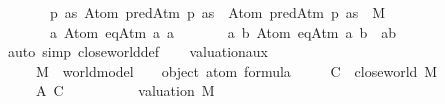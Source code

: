 \begin{isabellebody}
\ \ \ \ \ \ {\isasymor}\ {\isacharparenleft}{\kern0pt}{\isasymexists}p\ as{\isachardot}{\kern0pt}\ {\isasymphi}{\isacharequal}{\kern0pt}\isactrlbold {\isasymnot}{\isacharparenleft}{\kern0pt}Atom\ {\isacharparenleft}{\kern0pt}predAtm\ p\ as{\isacharparenright}{\kern0pt}{\isacharparenright}{\kern0pt}\ {\isasymand}\ Atom\ {\isacharparenleft}{\kern0pt}predAtm\ p\ as{\isacharparenright}{\kern0pt}\ {\isasymnotin}\ M{\isacharparenright}{\kern0pt}\isanewline
\ \ \ \ \ \ {\isasymor}\ {\isacharparenleft}{\kern0pt}{\isasymexists}a{\isachardot}{\kern0pt}\ {\isasymphi}{\isacharequal}{\kern0pt}Atom\ {\isacharparenleft}{\kern0pt}eqAtm\ a\ a{\isacharparenright}{\kern0pt}{\isacharparenright}{\kern0pt}\isanewline
\ \ \ \ \ \ {\isasymor}\ {\isacharparenleft}{\kern0pt}{\isasymexists}a\ b{\isachardot}{\kern0pt}\ {\isasymphi}{\isacharequal}{\kern0pt}\isactrlbold {\isasymnot}{\isacharparenleft}{\kern0pt}Atom\ {\isacharparenleft}{\kern0pt}eqAtm\ a\ b{\isacharparenright}{\kern0pt}{\isacharparenright}{\kern0pt}\ {\isasymand}\ a{\isasymnoteq}b{\isacharparenright}{\kern0pt}\isanewline
\ \ \ \ {\isacharparenright}{\kern0pt}{\isachardoublequoteclose}\isanewline
%
\isadelimproof
\ \ \ \ %
\endisadelimproof
%
\isatagproof
{}\isamarkupfalse%
\ {\isacharparenleft}{\kern0pt}auto\ simp{\isacharcolon}{\kern0pt}\ close{\isacharunderscore}{\kern0pt}world{\isacharunderscore}{\kern0pt}def{\isacharparenright}{\kern0pt}%
\endisatagproof
{\isafoldproof}%
%
\isadelimproof
\isanewline
%
\endisadelimproof
\isanewline
\ \ \isamarkupfalse%
\ valuation{\isacharunderscore}{\kern0pt}aux{\isacharunderscore}{\kern0pt}{}{\isacharcolon}{\kern0pt}\isanewline
\ \ \ \ \ M\ {\isacharcolon}{\kern0pt}{\isacharcolon}{\kern0pt}\ world{\isacharunderscore}{\kern0pt}model\ \ {\isasymphi}\ {\isacharcolon}{\kern0pt}{\isacharcolon}{\kern0pt}\ {\isachardoublequoteopen}object\ atom\ formula{\isachardoublequoteclose}\isanewline
\ \ \ \ \ {\isachardoublequoteopen}C\ {\isasymequiv}\ close{\isacharunderscore}{\kern0pt}world\ M{\isachardoublequoteclose}\isanewline
\ \ \ \ \ A{\isacharcolon}{\kern0pt}\ {\isachardoublequoteopen}{\isasymforall}{\isasymphi}{\isasymin}C{\isachardot}{\kern0pt}\ {\isasymA}\ {\isasymTurnstile}\ {\isasymphi}{\isachardoublequoteclose}\isanewline
\ \ \ \ \ {\isachardoublequoteopen}{\isasymA}\ {\isacharequal}{\kern0pt}\ valuation\ M{\isachardoublequoteclose}\isanewline
%
\isadelimproof
\ \ \ \ %
\endisadelimproof
%
\isatagproof
{}\isamarkupfalse%

\end{isabellebody}
